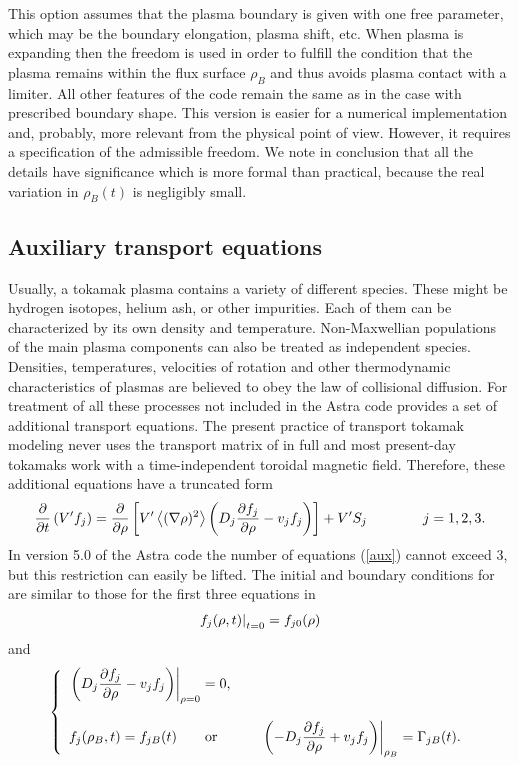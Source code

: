 This option assumes that the plasma boundary is given with one free
parameter, which may be the boundary elongation, plasma shift, etc. 
When plasma is expanding then the freedom is used in order to fulfill the
condition that the plasma remains within the flux surface $\rho_B$ and
thus avoids plasma contact with a limiter. 
All other features of the code remain the same as in the case with
prescribed boundary shape. 
This version is easier for a numerical implementation and, probably,
more relevant from the physical point of view. 
However, it requires a specification of the admissible freedom. 
We note in conclusion that all the details have significance which is
more formal than practical, because the real variation in $\rho_B(t)$ is
negligibly small. 

\subsection{Auxiliary transport equations}

Usually, a tokamak plasma contains a variety of different species. 
These might be hydrogen isotopes, helium ash, or other impurities. 
Each of them can be characterized by its own density and temperature. 
Non-Maxwellian populations of the main plasma components can also be
treated as independent species. 
Densities, temperatures, velocities of rotation and other thermodynamic
characteristics of plasmas are believed to obey the law of collisional
diffusion. 
For treatment of all these processes not included in  the
Astra code provides a set of additional transport equations. 
The present practice of transport tokamak modeling never uses the
transport matrix of  in full and most present-day tokamaks
work with a time-independent toroidal magnetic field. 
Therefore, these additional equations have a truncated form 
\begin{equation}\label{aux}
\displaystyle{\partial \over\partial t}\left(V'f_j\right)
=\displaystyle{\partial \over\partial \rho}
\left[V'
\left<(\nabla\rho)^2\right>\left(D_j\displaystyle{\partial f_j\over\partial \rho}-v_j f_j\right)
\right]
+V'S_j
\qquad\qquad 
j=1,2,3
.\end{equation}
In version 5.0 of the Astra code the number of equations (\ref{aux})
cannot exceed 3, but this restriction can easily be lifted. 
The initial and boundary conditions for  are similar to those
for the first three equations in  
\begin{equation}\label{icf}
\left.f_j(\rho,t)\right|_{t=0}=f_{j0}(\rho)
\end{equation}
and
\begin{equation}\label{bcf}
\lb\{\begin{array}{l}
\lb.\left(D_j\prti{f_j}{\rho}-v_j f_j\right)\rb|_{\rho=0}
=0
,\bigskip\\
f_j(\rho_B,t)=f_{jB}(t)
\qquad \mbox{or}\Quad
\lb.\left(-D_j\prti{f_j}{\rho}+v_j f_j\right)\rb|_{\rho_B}=\Gamma_{jB}(t)
.\end{array}\rb.
\end{equation}

